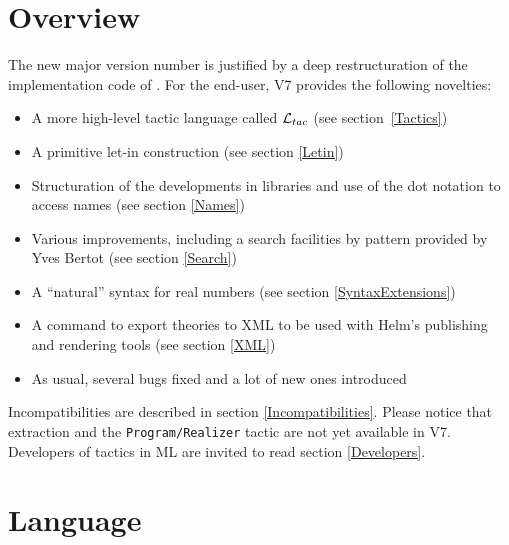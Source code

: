 \documentclass[11pt]{article}
\begin{document}


\def\ltac{{\cal L}_{tac}}

\section*{Overview}

The new major version number is justified by a deep restructuration of
the implementation code of \Coq. For the end-user, {\Coq}
V7 provides the following novelties:

\begin{itemize}
\item A more high-level tactic language called $\ltac$ (see
section~\ref{Tactics})

\item A primitive let-in construction (see section \ref{Letin})
\item Structuration of the developments in libraries and use of the
dot notation to access names (see section \ref{Names})
\item Various improvements, including a search facilities by pattern
provided by Yves Bertot (see section \ref{Search})
\item A ``natural'' syntax for real numbers (see section
\ref{SyntaxExtensions}) 
\item A command to export theories to XML to
be used with Helm's publishing and rendering tools (see section \ref{XML})
\item As usual, several bugs fixed and a lot of new ones introduced
\end{itemize}

Incompatibilities are described in section
\ref{Incompatibilities}. Please notice that extraction and the
{\tt Program/Realizer} tactic are not yet available in {\Coq} V7.
Developers of tactics in ML are invited to read section
\ref{Developers}.

\section{Language}

\label{Language}
\end{document}
